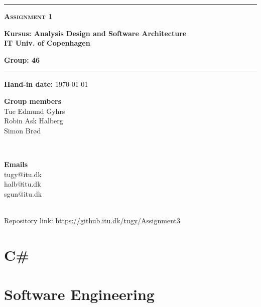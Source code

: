 \documentclass[11pt,a4paper]{article}
\newcommand{\charactercount}[1]{
\immediate\write18{expr `texcount -1 -sum -merge #1.tex` + `texcount -1 -sum -merge -char #1.tex` - 1 
    > chars4.txt
}}
\begin{document}
\begin{titlepage}
    
\centering
	\rule{\linewidth}{1pt} \par
	{\scshape\Huge\bfseries Assignment 1 \par} 
	\vspace{1pt} {\Large \textbf{Kursus: Analysis Design and Software Architecture\\
	IT Univ. of Copenhagen}\par}
	\vspace{1pt} {\Large \textbf{Group: 46}\par}
	\rule{\linewidth}{1pt} \par
	\vspace*{2cm}
\centering
\Large \textbf{Hand-in date:} \today\\ [5mm]


\begin{minipage}{0.4\textwidth}
\begin{flushleft} \large



\textbf{Group members}\\

Tue Edmund Gyhrs\\
Robin Ask Halberg\\
Simon Brød\\
\end{flushleft}
\end{minipage}
~
\begin{minipage}{0.4\textwidth}
\begin{flushright} \large
\textbf{Emails} \\
tugy@itu.dk\\
halb@itu.dk\\
sgun@itu.dk\\
\end{flushright}
\end{minipage}\\[4cm]
Repository link:
\url{https://github.itu.dk/tugy/Assignment3}
\end{titlepage}
\section*{C\#}
\section*{Software Engineering}
\end{document}
